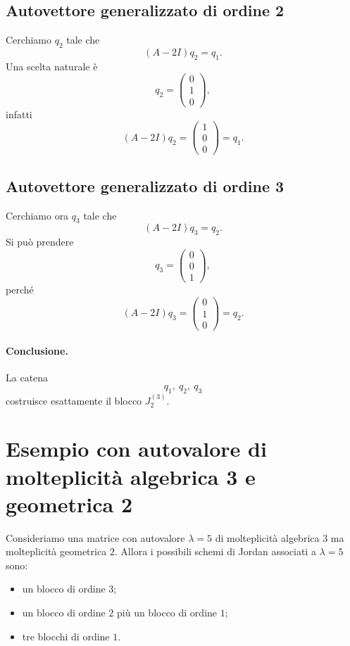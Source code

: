 \subsection{Autovettore generalizzato di ordine 2}

Cerchiamo $q_2$ tale che
\[
(A-2I)q_2=q_1.
\]
Una scelta naturale è
\[
q_2=
\begin{pmatrix}
0\\
1\\
0
\end{pmatrix},
\]
infatti
\[
(A-2I)q_2=
\begin{pmatrix}
1\\
0\\
0
\end{pmatrix}
=q_1.
\]

\subsection{Autovettore generalizzato di ordine 3}

Cerchiamo ora $q_3$ tale che
\[
(A-2I)q_3=q_2.
\]
Si può prendere
\[
q_3=
\begin{pmatrix}
0\\
0\\
1
\end{pmatrix},
\]
perché
\[
(A-2I)q_3=
\begin{pmatrix}
0\\
1\\
0
\end{pmatrix}
=q_2.
\]

\paragraph{Conclusione.}
La catena
\[
q_1,\ q_2,\ q_3
\]
costruisce esattamente il blocco $J_2^{(3)}$.

\section{Esempio con autovalore di molteplicità algebrica 3 e geometrica 2}

Consideriamo una matrice con autovalore $\lambda=5$ di molteplicità algebrica $3$ ma molteplicità geometrica $2$.  
Allora i possibili schemi di Jordan associati a $\lambda=5$ sono:
\begin{itemize}
    \item un blocco di ordine $3$;
    \item un blocco di ordine $2$ più un blocco di ordine $1$;
    \item tre blocchi di ordine $1$.
\end{itemize}

